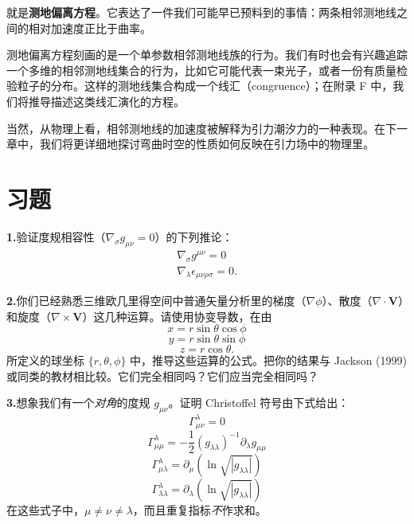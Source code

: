 就是\textbf{测地偏离方程}。它表达了一件我们可能早已预料到的事情：两条相邻测地线之间的相对加速度正比于曲率。

测地偏离方程刻画的是一个单参数相邻测地线族的行为。我们有时也会有兴趣追踪一个多维的相邻测地线集合的行为，比如它可能代表一束光子，或者一份有质量检验粒子的分布。这样的测地线集合构成一个线汇（congruence）；在附录 F 中，我们将推导描述这类线汇演化的方程。

当然，从物理上看，相邻测地线的加速度被解释为引力潮汐力的一种表现。在下一章中，我们将更详细地探讨弯曲时空的性质如何反映在引力场中的物理里。

\section{习题}

\textbf{1.}\quad 验证度规相容性（$\nabla_{\sigma}g_{\mu\nu}=0$）的下列推论：
\begin{gather*}
\nabla_{\sigma}g^{\mu\nu} = 0\\
\nabla_{\lambda}\epsilon_{\mu\nu\rho\sigma} = 0.
\tag{3.209}
\end{gather*}

\textbf{2.}\quad 你们已经熟悉三维欧几里得空间中普通矢量分析里的梯度（$\nabla\phi$）、散度（$\nabla\cdot\mathbf{V}$）和旋度（$\nabla\times\mathbf{V}$）这几种运算。请使用协变导数，在由
\begin{equation*}
x = r\sin\theta\cos\phi
\tag{3.210}
\end{equation*}
\begin{equation*}
y = r\sin\theta\sin\phi
\tag{3.211}
\end{equation*}
\begin{equation*}
z = r\cos\theta.
\tag{3.212}
\end{equation*}
所定义的球坐标 $\{r,\theta,\phi\}$ 中，推导这些运算的公式。把你的结果与 Jackson (1999) 或同类的教材相比较。它们完全相同吗？它们应当完全相同吗？

\textbf{3.}\quad 想象我们有一个\emph{对角}的度规 $g_{\mu\nu}$。证明 Christoffel 符号由下式给出：
\begin{equation*}
\Gamma^{\lambda}_{\mu\nu} = 0
\tag{3.213}
\end{equation*}
\begin{equation*}
\Gamma^{\lambda}_{\mu\mu} = -\frac{1}{2}(g_{\lambda\lambda})^{-1}\partial_{\lambda}g_{\mu\mu}
\tag{3.214}
\end{equation*}
\begin{equation*}
\Gamma^{\lambda}_{\mu\lambda} = \partial_{\mu}\left(\ln\sqrt{|g_{\lambda\lambda}|}\right)
\tag{3.215}
\end{equation*}
\begin{equation*}
\Gamma^{\lambda}_{\lambda\lambda} = \partial_{\lambda}\left(\ln\sqrt{|g_{\lambda\lambda}|}\right)
\tag{3.216}
\end{equation*}
在这些式子中，$\mu\neq\nu\neq\lambda$，而且重复指标\emph{不}作求和。

